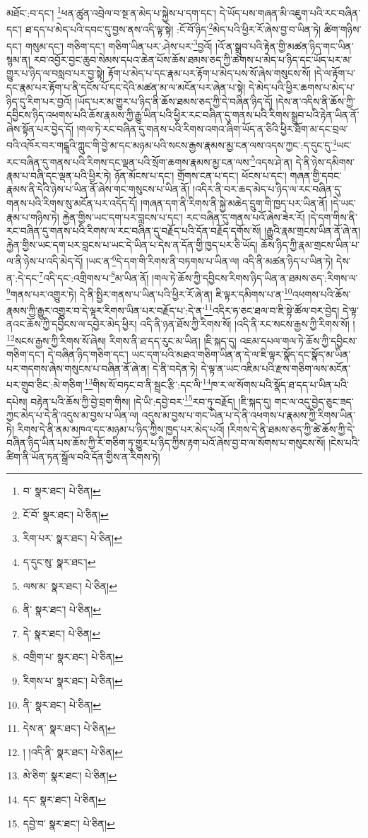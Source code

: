 མཐོང་:བ་དང་། \footnote{བ་  སྣར་ཐང་།  པེ་ཅིན། }ཕན་ཚུན་འབྲེལ་བ་སྔ་ན་མེད་པ་སྐྱེས་པ་དག་དང་། དེ་ཡོད་པས་གཞན་མི་འཇུག་པའི་རང་བཞིན་དང་། ཐ་དད་པ་མེད་པའི་དབང་དུ་བྱས་ནས་འདི་ལྟ་སྟེ། :ངོ་བོ་ཉིད་\footnote{ངོ་བོ་  སྣར་ཐང་།  པེ་ཅིན། }མེད་པའི་ཕྱིར་རོ་ཞེས་བྱ་བ་ཡིན་ཏེ། ཚིག་གཉིས་དང་། གསུམ་དང་། གཅིག་དང་། གཅིག་ཡིན་པར་:ཤེས་པར་\footnote{རིག་པར་  སྣར་ཐང་།  པེ་ཅིན། }བྱའོ། །འོ་ན་སྒྲུབ་པའི་རྟེན་གྱི་མཚན་ཉིད་གང་ཡིན་སྙམ་ན། རབ་འབྱོར་བྱང་ཆུབ་སེམས་དཔའ་ཆེན་པོས་ཆོས་ཐམས་ཅད་ཀྱི་ཆགས་པ་མེད་པ་ཉིད་དང་ཡོད་པར་མ་གྱུར་པ་ཉིད་ལ་བསླབ་པར་བྱ་སྟེ། རྟོག་པ་མེད་པ་དང་རྣམ་པར་རྟོག་པ་མེད་པས་སོ་ཞེས་གསུངས་སོ། །དེ་ལ་རྟོག་པ་དང་རྣམ་པར་རྟོག་པ་ནི་དངོས་པོ་དང་དེའི་མཚན་མ་ལ་མངོན་པར་ཞེན་པ་སྟེ། དེ་མེད་པའི་ཕྱིར་ཆགས་པ་མེད་པ་ཉིད་དུ་རིག་པར་བྱའོ། །ཡོད་པར་མ་གྱུར་པ་ཉིད་ནི་ཆོས་ཐམས་ཅད་ཀྱི་དེ་བཞིན་ཉིད་དོ། །དེས་ན་འདིས་ནི་ཆོས་ཀྱི་དབྱིངས་ཉིད་འཕགས་པའི་ཆོས་རྣམས་ཀྱི་རྒྱུ་ཡིན་པའི་ཕྱིར་རང་བཞིན་དུ་གནས་པའི་རིགས་སྒྲུབ་པའི་རྟེན་ཡིན་ནོ་ཞེས་སྟོན་པར་བྱེད་དོ། །གལ་ཏེ་རང་བཞིན་དུ་གནས་པའི་རིགས་འགའ་ཞིག་ཡོད་ན་ཅིའི་ཕྱིར་ཐོག་མ་དང་བྲལ་བའི་འཁོར་བར་གངྒཱའི་ཀླུང་གི་བྱེ་མ་དང་མཉམ་པའི་སངས་རྒྱས་རྣམས་མྱ་ངན་ལས་འདས་ཀྱང་:ད་དུང་དུ་\footnote{ད་དུང་སུ་  སྣར་ཐང་། }ཡང་རང་བཞིན་དུ་གནས་པའི་རིགས་དང་ལྡན་པའི་སྲོག་ཆགས་རྣམས་མྱ་ངན་ལས་\footnote{ལས་མ་  སྣར་ཐང་།  པེ་ཅིན། }འདས་ཤེ་ན། དེ་ནི་ཉེས་དམིགས་རྣམ་པ་བཞི་དང་ལྡན་པའི་ཕྱིར་ཏེ། ཉོན་མོངས་པ་དང་། གྲོགས་ངན་པ་དང་། ཕོངས་པ་དང་། གཞན་གྱི་དབང་རྣམས་ནི་དེའི་ཉེས་པ་ཡིན་ནོ་ཞེས་གང་གསུངས་པ་ཡིན་ནོ། །འདིར་ནི་བར་ཆད་མེད་པ་ཉིད་ལ་རང་བཞིན་དུ་གནས་པའི་རིགས་སུ་མངོན་པར་འདོད་དོ། །གཞན་དག་ནི་རིགས་ནི་སྐྱེ་མཆེད་དྲུག་གི་ཁྱད་པར་ཡིན་ནོ། །དེ་ཡང་རྣམ་པ་གཉིས་ཏེ། རྐྱེན་གྱིས་ཡང་དག་པར་བླངས་པ་དང་། རང་བཞིན་དུ་གནས་པའོ་ཞེས་ཟེར་རོ། །དེ་དག་གིས་ནི་རང་བཞིན་དུ་གནས་པའི་རིགས་ལ་རང་བཞིན་དུ་བརྗོད་པའི་དོན་བརྗོད་དགོས་སོ། །རྒྱུའི་རྣམ་གྲངས་ཡིན་ནོ་ཞེ་ན། རྐྱེན་གྱིས་ཡང་དག་པར་བླངས་པ་ཡང་དེ་ཡིན་པ་དེས་ན་དོན་གྱི་ཁྱད་པར་ཅི་ཡོད། ཆོས་ཉིད་ཀྱི་རྣམ་གྲངས་ཡིན་པ་ལ་ནི་ཉེས་པ་འདི་མེད་དོ། །ཡང་ན་\footnote{ནི་  སྣར་ཐང་།  པེ་ཅིན། }དེ་དག་གི་རིགས་ནི་བཏགས་པ་ཡིན་ལ། འདི་ནི་མཚན་ཉིད་པ་ཡིན་ཏེ། དེས་ན་:དེ་དང་\footnote{དེ་  སྣར་ཐང་།  པེ་ཅིན། }འདི་དང་:འགྲིགས་པ་\footnote{འགྲིག་པ་  སྣར་ཐང་།  པེ་ཅིན། }མ་ཡིན་ནོ། །གལ་ཏེ་ཆོས་ཀྱི་དབྱིངས་རིགས་ཉིད་ཡིན་ན་ཐམས་ཅད་:རིགས་ལ་\footnote{རིགས་པ་  སྣར་ཐང་།  པེ་ཅིན། }གནས་པར་འགྱུར་ཏེ། དེ་ནི་སྤྱིར་གནས་པ་ཡིན་པའི་ཕྱིར་རོ་ཞེ་ན། ཇི་ལྟར་དམིགས་པ་ན་\footnote{ནི་  སྣར་ཐང་།  པེ་ཅིན། }འཕགས་པའི་ཆོས་རྣམས་ཀྱི་རྒྱུར་འགྱུར་བ་དེ་ལྟར་རིགས་ཡིན་པར་བརྗོད་པ་:དེ་ན་\footnote{དེས་ན་  སྣར་ཐང་།  པེ་ཅིན། }འདིར་ཧ་ཅང་ཐལ་བ་ཇི་སྟེ་ཚོལ་བར་བྱེད། དེ་ལྟ་ནའང་ཆོས་ཀྱི་དབྱིངས་ལ་དབྱེར་མེད་ཕྱིར། འདི་ནི་ཉན་ཐོས་ཀྱི་རིགས་སོ། །འདི་ནི་རང་སངས་རྒྱས་ཀྱི་རིགས་སོ། །\footnote{། །འདི་ནི་  སྣར་ཐང་།  པེ་ཅིན། }སངས་རྒྱས་ཀྱི་རིགས་སོ་ཞེས། རིགས་ནི་ཐ་དད་རུང་མ་ཡིན། །ཇི་སྐད་དུ། འཇམ་དཔལ་གལ་ཏེ་ཆོས་ཀྱི་དབྱིངས་གཅིག་དང་། དེ་བཞིན་ཉིད་གཅིག་དང་། ཡང་དག་པའི་མཐའ་གཅིག་ཡིན་ན་དེ་ལ་ཇི་ལྟར་སྣོད་དང་སྣོད་མ་ཡིན་པར་གདགས་ཞེས་གསུངས་པ་བཞིན་ནོ་ཞེ་ན། དེ་ནི་བདེན་ཏེ། དེ་ལྟ་ན་ཡང་འཇིམ་པའི་རྫས་གཅིག་ལས་མངོན་པར་གྲུབ་ཅིང་:མེ་གཅིག་\footnote{མེ་ཅིག་  སྣར་ཐང་།  པེ་ཅིན། }གིས་སོ་བཏང་བ་ནི་སྦྲང་རྩི་:དང་ལི་\footnote{དང་  སྣར་ཐང་།  པེ་ཅིན། }ཁ་ར་ལ་སོགས་པའི་སྣོད་ཐ་དད་པ་ཡིན་པའི་དཔེས། བརྟེན་པའི་ཆོས་ཀྱི་བྱེ་བྲག་གིས། །དེ་ཡི་:དབྱེ་བར་\footnote{དབྱེ་བ་  སྣར་ཐང་།  པེ་ཅིན། }རབ་ཏུ་བརྗོད། །ཇི་སྐད་དུ། གང་ལ་འདུ་བྱེད་ཅུང་ཟད་ཀྱང་མེད་པ་དེ་ནི་འདུས་མ་བྱས་པ་ཡིན་ལ། འདུས་མ་བྱས་པ་གང་ཡིན་པ་དེ་ནི་འཕགས་པ་རྣམས་ཀྱི་རིགས་ཡིན་ཏེ། རིགས་དེ་ནི་ནམ་མཁའ་དང་མཉམ་པ་ཉིད་ཀྱིས་ཁྱད་པར་མེད་པའོ། །རིགས་དེ་ནི་ཐམས་ཅད་ཀྱི་ཚེ་ཆོས་ཀྱི་དེ་བཞིན་ཉིད་ཡིན་པས་ཆོས་ཀྱི་རོ་གཅིག་ཏུ་གྱུར་པ་ཉིད་ཀྱིས་རྟག་པའོ་ཞེས་བྱ་བ་ལ་སོགས་པ་གསུངས་སོ། །ངེས་པའི་ཚིག་ནི་ཡོན་ཏན་སྒྲོལ་བའི་དོན་གྱིས་ན་རིགས་ཏེ། 